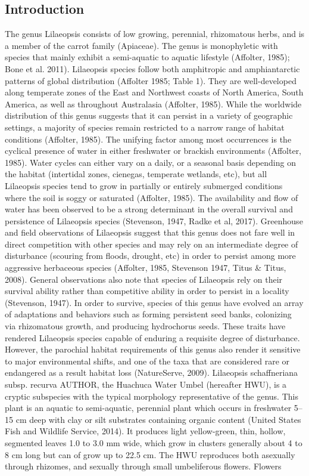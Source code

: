 \documentclass[multicol]{elsarticle}
\begin{document}
\begin{multicols}{2}

\section{Introduction}
The genus Lilaeopsis consists of low growing, perennial, rhizomatous herbs, and is a member of the carrot family (Apiaceae). The genus is monophyletic with species that mainly exhibit a semi-aquatic to aquatic lifestyle (Affolter, 1985); Bone et al. 2011). Lilaeopsis species follow both amphitropic and amphiantarctic patterns of global distribution (Affolter 1985; Table 1). They are well-developed along temperate zones of the East and Northwest coasts of North America, South America, as well as throughout Australasia (Affolter, 1985). While the worldwide distribution of this genus suggests that it can persist in a variety of geographic settings, a majority of species remain restricted to a narrow range of habitat conditions (Affolter, 1985). The unifying factor among most occurrences is the cyclical presence of water in either freshwater or brackish environments (Affolter, 1985). Water cycles can either vary on a daily, or a seasonal basis depending on the habitat (intertidal zones, cienegas, temperate wetlands, etc), but all Lilaeopsis species tend to grow in partially or entirely submerged conditions where the soil is soggy or saturated (Affolter, 1985). The availability and flow of water has been observed to be a strong determinant in the overall survival and persistence of Lilaeopsis species (Stevenson, 1947, Radke et al, 2017). Greenhouse and field observations of Lilaeopsis suggest that this genus does not fare well in direct competition with other species and may rely on an intermediate degree of disturbance (scouring from floods, drought, etc) in order to persist among more aggressive herbaceous species (Affolter, 1985, Stevenson 1947, Titus & Titus, 2008). General observations also note that species of Lilaeopsis rely on their survival ability rather than competitive ability in order to persist in a locality (Stevenson, 1947). In order to survive, species of this genus have evolved an array of adaptations and behaviors such as forming persistent seed banks, colonizing via rhizomatous growth, and producing hydrochorus seeds. These traits have rendered Lilaeopsis species capable of enduring a requisite degree of disturbance. However, the parochial habitat requirements of this genus also render it sensitive to major environmental shifts, and one of the taxa that are considered rare or endangered as a result habitat loss (NatureServe, 2009). Lilaeopsis schaffneriana subsp. recurva AUTHOR, the Huachuca Water Umbel (hereafter HWU), is a cryptic subspecies with the typical morphology representative of the genus. This plant is an aquatic to semi-aquatic, perennial plant which occurs in freshwater 5–15 cm deep with clay or silt substrates containing organic content (United States Fish and Wildlife Service, 2014). It produces light yellow-green, thin, hollow, segmented leaves 1.0 to 3.0 mm wide, which grow in clusters generally about 4 to 8 cm long but can of grow up to 22.5 cm. The HWU reproduces both asexually through rhizomes, and sexually through small umbeliferous flowers. Flowers 
\end{multicols}
\end{document}
